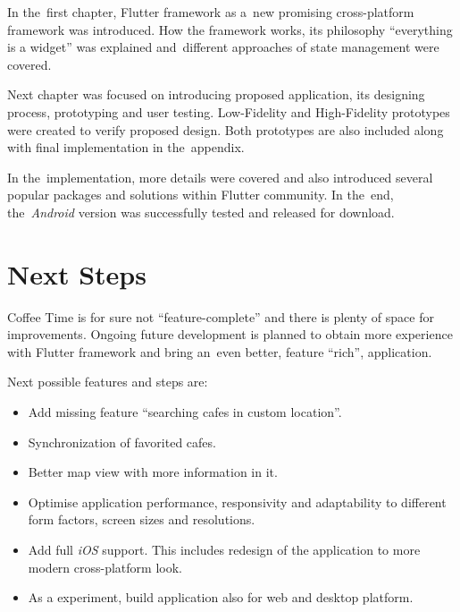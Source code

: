 \begin{conclusion}
In the~first chapter, Flutter framework as a~new promising cross-platform framework was introduced. How the framework works, its philosophy ``everything is a widget'' was explained and~different approaches of state management were covered. 

Next chapter was focused on introducing proposed application, its designing process, prototyping and user testing. Low-Fidelity and High-Fidelity prototypes were created to verify proposed design. Both prototypes are also included along with final implementation in the~appendix. 

In the~implementation, more details were covered and also introduced several popular packages and solutions within Flutter community. In the~end, the~\textit{Android} version was successfully tested and released for download. 

\section{Next Steps}
Coffee Time is for sure not ``feature-complete'' and there is plenty of space for improvements. Ongoing future development is planned to obtain more experience with Flutter framework and bring an~even better, feature ``rich'', application.

Next possible features and steps are:

\begin{itemize}
    \item Add missing feature ``searching cafes in custom location''.
    \item Synchronization of favorited cafes.
    \item Better map view with more information in it.
    \item Optimise application performance, responsivity and adaptability to different form factors, screen sizes and resolutions.
    \item Add full \textit{iOS} support. This includes redesign of the application to more modern cross-platform look. 
    \item As a experiment, build application also for web and desktop platform.
\end{itemize}


\end{conclusion}
